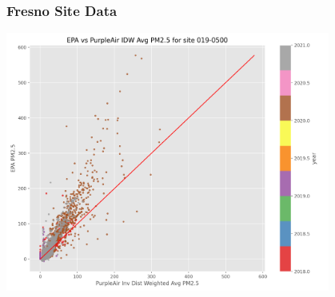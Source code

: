 \documentclass{beamer}
\begin{document}
\begin{frame}
\frametitle{Fresno Site Data}

\hspace{5em}
\includegraphics[width=0.8\textwidth]{pics/appendix/site_plots/site-019-0500_epa-pa-hourly-plot.png}
\end{frame}
\end{document}
